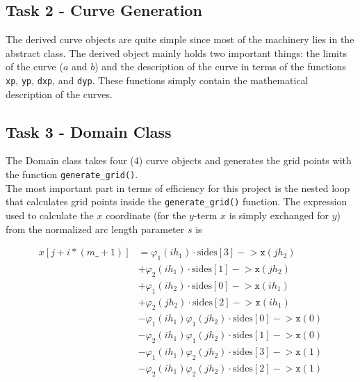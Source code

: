 \documentclass[paper=a4, fontsize=12pt]{article} %
\begin{document}
\subsection*{Task 2 - Curve Generation}

The derived curve objects are quite simple since most of the machinery lies in the abstract class. The derived object mainly holds two important things: the limits of the curve ($a$ and $b$) and the description of the curve in terms of the functions \texttt{xp}, \texttt{yp}, \texttt{dxp}, and \texttt{dyp}. These functions simply contain the mathematical description of the curves.

\subsection*{Task 3 - Domain Class}

The Domain class takes four (4) curve objects and generates the grid points with the function \texttt{generate\_grid()}.\\

The most important part in terms of efficiency for this project is the nested loop that calculates grid points inside the \texttt{generate\_grid()} function. The expression used to calculate the $x$ coordinate (for the $y$-term $x$ is simply exchanged for $y$) from the normalized arc length parameter $s$ is

\begin{align*}
x[j+i*(m\_+1)]  &= \varphi_1(ih_1)\cdot \textrm{sides}[3]-\!\!>\texttt{x}(jh_2) \\
	&+ \varphi_2(ih_1)\cdot \textrm{sides}[1]-\!\!>\texttt{x}(jh_2) \\
	&+ \varphi_1(ih_2)\cdot \textrm{sides}[0]-\!\!>\texttt{x}(ih_1) \\
	&+ \varphi_2(jh_2)\cdot \textrm{sides}[2]-\!\!>\texttt{x}(ih_1) \\
	&- \varphi_1(ih_1) \varphi_1(jh_2) \cdot  \textrm{sides}[0]-\!\!>\texttt{x}(0) \\
	&- \varphi_2(ih_1) \varphi_1(jh_2) \cdot  \textrm{sides}[1]-\!\!>\texttt{x}(0) \\
	&- \varphi_1(ih_1) \varphi_2(jh_2) \cdot  \textrm{sides}[3]-\!\!>\texttt{x}(1) \\
	&- \varphi_2(ih_1) \varphi_2(jh_2) \cdot  \textrm{sides}[2]-\!\!>\texttt{x}(1)
\end{align*}
\end{document}
